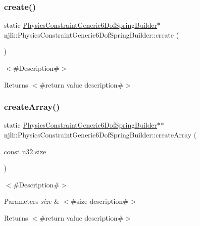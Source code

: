 \subsubsection{\texorpdfstring{create()}{create()}}
{\footnotesize\ttfamily static \mbox{\hyperlink{classnjli_1_1_physics_constraint_generic6_dof_spring_builder}{Physics\+Constraint\+Generic6\+Dof\+Spring\+Builder}}$\ast$ njli\+::\+Physics\+Constraint\+Generic6\+Dof\+Spring\+Builder\+::create (\begin{DoxyParamCaption}{ }\end{DoxyParamCaption})\hspace{0.3cm}{\ttfamily [static]}}

$<$\#\+Description\#$>$

\begin{DoxyReturn}{Returns}
$<$\#return value description\#$>$ 
\end{DoxyReturn}
\mbox{\label{classnjli_1_1_physics_constraint_generic6_dof_spring_builder_a85e7ce26bf8b5217dc8ba1d5431bd5e9}} 
\subsubsection{\texorpdfstring{create\+Array()}{createArray()}}
{\footnotesize\ttfamily static \mbox{\hyperlink{classnjli_1_1_physics_constraint_generic6_dof_spring_builder}{Physics\+Constraint\+Generic6\+Dof\+Spring\+Builder}}$\ast$$\ast$ njli\+::\+Physics\+Constraint\+Generic6\+Dof\+Spring\+Builder\+::create\+Array (\begin{DoxyParamCaption}\item[{const \mbox{\hyperlink{_util_8h_a10e94b422ef0c20dcdec20d31a1f5049}{u32}}}]{size }\end{DoxyParamCaption})\hspace{0.3cm}{\ttfamily [static]}}

$<$\#\+Description\#$>$


\begin{DoxyParams}{Parameters}
{\em size} & $<$\#size description\#$>$\\
\hline
\end{DoxyParams}
\begin{DoxyReturn}{Returns}
$<$\#return value description\#$>$ 
\end{DoxyReturn}
\mbox{\label{classnjli_1_1_physics_constraint_generic6_dof_spring_builder_a66c67a6cb1e2b3277a92f0d4704767bc}} 
